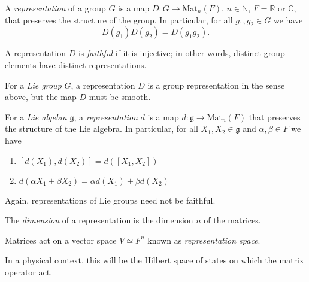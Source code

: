 \begin{definition}
  A \emph{representation} of a group $G$ is a map $D \colon G \to \text{Mat}_n(F)$, $n \in \mathbb{N}$, $F = \mathbb{R} \text{ or } \mathbb{C}$, that preserves the structure  of the group. In particular, for all $g_1, g_2 \in G$ we have
  \begin{equation}
    D(g_1) D(g_2) = D(g_1 g_2).
  \end{equation}
\end{definition}
\begin{definition}[]
  A representation $D$ is \emph{faithful} if it is injective; in other words, distinct group elements have distinct representations.
\end{definition}
\begin{definition}
  For a \emph{Lie group} $G$, a representation $D$ is a group representation in the sense above, but the map $D$ must be smooth.
\end{definition}
\begin{definition}[]
  For a \emph{Lie algebra} $\mathfrak{g}$, a \emph{representation} $d$ is a map $d: \mathfrak{g} \to \text{Mat}_n(F)$ that preserves the structure of the Lie algebra. In particular, for all $X_1, X_2 \in \mathfrak{g}$ and $\alpha, \beta \in F$ we have
  \begin{enumerate}
    \item $[d(X_1), d(X_2)] = d([X_1, X_2])$
    \item $d(\alpha X_1 + \beta X_2) = \alpha d(X_1) + \beta d(X_2)$
  \end{enumerate}
\end{definition}
\begin{leftbar}
  \begin{remark}
    Again, representations of Lie groups need not be faithful.
  \end{remark}
\end{leftbar}
\begin{definition}[]
  The \emph{dimension} of a representation is the dimension $n$ of the matrices.
\end{definition}
\begin{definition}[]
  Matrices act on a vector space $V \simeq F^n$ known as \emph{representation space}.
\end{definition}
\begin{leftbar}
  \begin{remark}
    In a physical context, this will be the Hilbert space of states on which the matrix operator act.
  \end{remark}
\end{leftbar}


